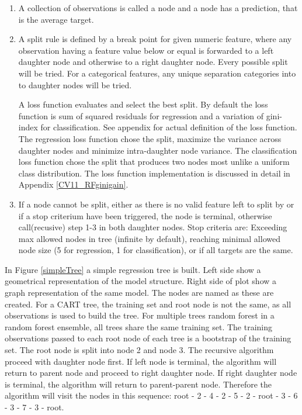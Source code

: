 \begin{enumerate}  
\item A collection of observations is called a node and a node has a prediction, that is the average target.

\item A split rule is defined by a break point for given numeric feature, where any observation having a feature value below or equal is forwarded to a left daughter node and otherwise to a right daughter node. Every possible split will be tried. For a categorical features, any unique separation categories into to daughter nodes will be tried.

A loss function evaluates and select the best split. By default the loss function is sum of squared residuals for regression and a variation of gini-index for classification. See appendix for actual definition of the loss function. The regression loss function chose the split, maximize the variance across daughter nodes and minimize intra-daughter node variance. The classification loss function chose the split that produces two nodes most unlike a uniform class distribution. The loss function implementation is discussed in detail in Appendix \ref{CV11_RFginigain}.

\item If a node cannot be split, either as there is no valid feature left to split by or if a stop criterium have been triggered, the node is terminal, otherwise call(recusive) step 1-3 in both daughter nodes. Stop criteria are: Exceeding max allowed nodes in tree (infinite by default), reaching minimal allowed node size (5 for regression, 1 for classification), or if all targets are the same.

\end{enumerate}

In Figure \ref{simpleTree} a simple regression tree is built. Left side show a geometrical representation of the model structure. Right side of plot show a graph representation of the same model. The nodes are named as these are created. For a CART tree, the training set and root node is not the same, as all observations is used to build the tree. For multiple trees random forest in a random forest ensemble, all trees share the same training set. The training observations passed to each root node of each tree is a bootstrap of the training set. The root node is split into node 2 and node 3. The recursive algorithm proceed with daughter node first. If left node is terminal, the algorithm will return to parent node and proceed to right daughter node. If right daughter node is terminal, the algorithm will return to parent-parent node. Therefore the algorithm will visit the nodes in this sequence: root - 2 - 4 - 2 - 5 - 2 - root - 3 - 6 - 3 - 7 - 3 - root.

